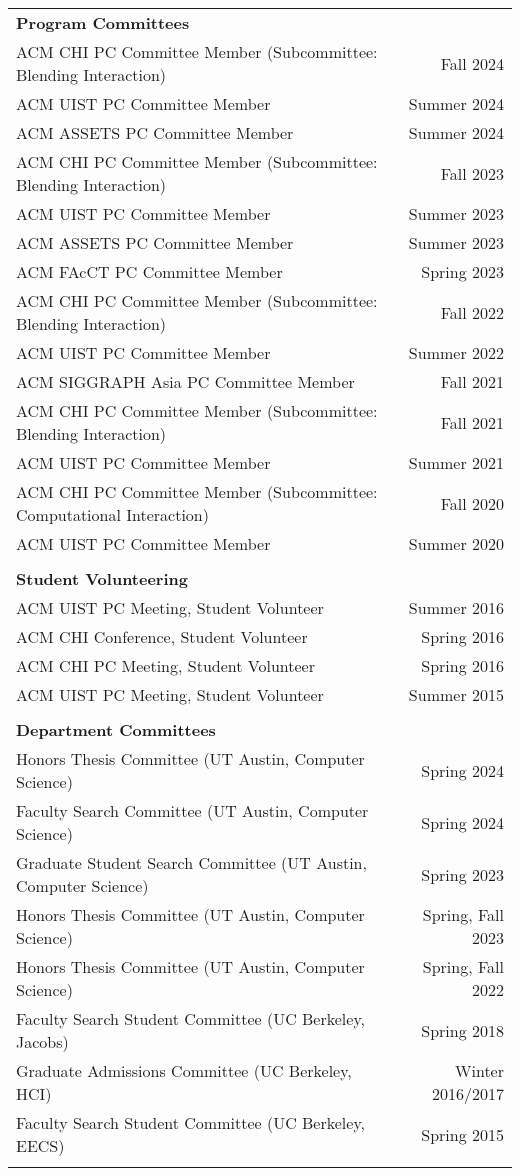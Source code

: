 \begin{longtable}{Xr}
	\textbf{Program Committees} &  \\
	ACM CHI PC Committee Member (Subcommittee: Blending Interaction) & Fall 2024 \\
	ACM UIST PC Committee Member & Summer 2024 \\
	ACM ASSETS PC Committee Member & Summer 2024 \\
	ACM CHI PC Committee Member (Subcommittee: Blending Interaction) & Fall 2023 \\
	ACM UIST PC Committee Member & Summer 2023 \\
	ACM ASSETS PC Committee Member & Summer 2023 \\
	ACM FAcCT PC Committee Member & Spring 2023 \\
	ACM CHI PC Committee Member (Subcommittee: Blending Interaction) & Fall 2022 \\
	ACM UIST PC Committee Member & Summer 2022 \\
	ACM SIGGRAPH Asia PC Committee Member & Fall 2021 \\
	ACM CHI PC Committee Member (Subcommittee: Blending Interaction) & Fall 2021 \\
	ACM UIST PC Committee Member & Summer 2021 \\
	ACM CHI PC Committee Member (Subcommittee: Computational Interaction) & Fall 2020 \\
	ACM UIST PC Committee Member & Summer 2020 \\
	\\

	\textbf{Student Volunteering} &  \\
	ACM UIST PC Meeting, Student Volunteer & Summer 2016 \\
	ACM CHI Conference, Student Volunteer & Spring 2016 \\
	ACM CHI PC Meeting, Student Volunteer & Spring 2016 \\
	ACM UIST PC Meeting, Student Volunteer & Summer 2015 \\
	\\

	\textbf{Department Committees} &  \\
	Honors Thesis Committee (UT Austin, Computer Science) & Spring 2024 \\
	Faculty Search Committee (UT Austin, Computer Science) & Spring 2024 \\
	Graduate Student Search Committee (UT Austin, Computer Science) & Spring 2023 \\
	Honors Thesis Committee (UT Austin, Computer Science) & Spring, Fall 2023 \\
	Honors Thesis Committee (UT Austin, Computer Science) & Spring, Fall 2022 \\
	Faculty Search Student Committee (UC Berkeley, Jacobs) & Spring 2018 \\
	Graduate Admissions Committee (UC Berkeley, HCI) & Winter 2016/2017 \\
	Faculty Search Student Committee (UC Berkeley, EECS) & Spring 2015 \\
	\\


\end{longtable}
